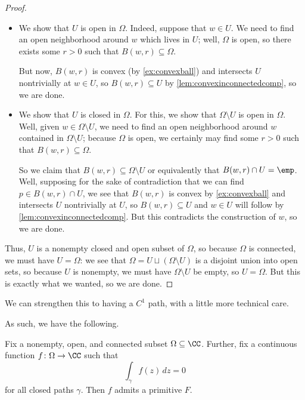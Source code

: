 \documentclass[../notes.tex]{subfiles}
\begin{document}
\begin{proof}
\begin{itemize}
		\item We show that $U$ is open in $\Omega$. Indeed, suppose that $w\in U$. We need to find an open neighborhood around $w$ which lives in $U$; well, $\Omega$ is open, so there exists some $r>0$ such that $B(w,r)\subseteq\Omega$.
		
		But now, $B(w,r)$ is convex (by \autoref{ex:convexball}) and intersects $U$ nontrivially at $w\in U$, so $B(w,r)\subseteq U$ by \autoref{lem:convexinconnectedcomp}, so we are done.

		\item We show that $U$ is closed in $\Omega$. For this, we show that $\Omega\setminus U$ is open in $\Omega$. Well, given $w\in\Omega\setminus U$, we need to find an open neighborhood around $w$ contained in $\Omega\setminus U$; because $\Omega$ is open, we certainly may find some $r>0$ such that $B(w,r)\subseteq\Omega$.

		So we claim that $B(w,r)\subseteq\Omega\setminus U$ or equivalently that $B(w,r)\cap U=\emp$. Well, supposing for the sake of contradiction that we can find $p\in B(w,r)\cap U$, we see that $B(w,r)$ is convex by \autoref{ex:convexball} and intersects $U$ nontrivially at $U$, so $B(w,r)\subseteq U$ and $w\in U$ will follow by \autoref{lem:convexinconnectedcomp}. But this contradicts the construction of $w$, so we are done.
	\end{itemize}
	Thus, $U$ is a nonempty closed and open subset of $\Omega$, so because $\Omega$ is connected, we must have $U=\Omega$: we see that $\Omega=U\sqcup(\Omega\setminus U)$ is a disjoint union into open sets, so because $U$ is nonempty, we must have $\Omega\setminus U$ be empty, so $U=\Omega$. But this is exactly what we wanted, so we are done.
\end{proof}
\begin{remark}
	We can strengthen this to having a $C^1$ path, with a little more technical care.
\end{remark}
As such, we have the following.
\begin{theorem} \label{thm:getprimitive}
	Fix a nonempty, open, and connected subset $\Omega\subseteq\CC$. Further, fix a continuous function $f\colon \Omega\to\CC$ such that
	\[\int_\gamma f(z)\,dz=0\]
	for all closed paths $\gamma$. Then $f$ admits a primitive $F$.
\end{theorem}
\end{document}
